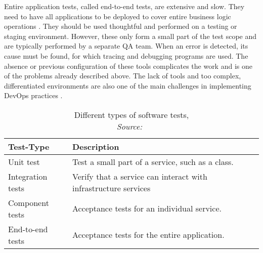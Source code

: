        Entire application tests, called end-to-end tests, are extensive and slow. They need to have all applications to be deployed to cover entire business logic operations \cite{microtest}. They should be used thoughtful and performed on a testing or staging environment. However, these only form a small part of the test scope and are typically performed by a separate \ac{QA} team. When an error is detected, its cause must be found, for which tracing and debugging programs are used. The absence or previous configuration of these tools complicates the work and is one of the problems already described above. The lack of tools and too complex, differentiated environments are also one of the main challenges in implementing DevOps practices \cite{devops_challenge}.

        \begin{table}[]
            \centering
            \begin{tabularx}{0.9\textwidth}{lX}
                Test-Type & Description \\ \midrule\midrule
                Unit test& Test a small part of a service, such as a class.\\
                Integration tests & Verify that a service can interact with infrastructure services \\
                Component tests & Acceptance tests for an individual service. \\
                End-to-end tests & Acceptance tests for the entire application.
            \end{tabularx}
            \caption{Different types of software tests, \\\textit{Source:~\cite{microtest}}}\label{tab::tests}
        \end{table}


